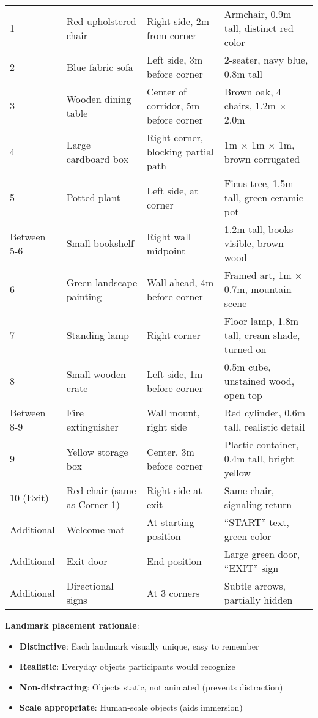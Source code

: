 \documentclass[12pt]{article}
\begin{document}
\begin{longtable}{p{}p{}p{}p{}}
1 & Red upholstered chair & Right side, 2m from corner & Armchair, 0.9m tall, distinct red color \\
2 & Blue fabric sofa & Left side, 3m before corner & 2-seater, navy blue, 0.8m tall \\
3 & Wooden dining table & Center of corridor, 5m before corner & Brown oak, 4 chairs, 1.2m $\times$ 2.0m \\
4 & Large cardboard box & Right corner, blocking partial path & 1m $\times$ 1m $\times$ 1m, brown corrugated \\
5 & Potted plant & Left side, at corner & Ficus tree, 1.5m tall, green ceramic pot \\
Between 5-6 & Small bookshelf & Right wall midpoint & 1.2m tall, books visible, brown wood \\
6 & Green landscape painting & Wall ahead, 4m before corner & Framed art, 1m $\times$ 0.7m, mountain scene \\
7 & Standing lamp & Right corner & Floor lamp, 1.8m tall, cream shade, turned on \\
8 & Small wooden crate & Left side, 1m before corner & 0.5m cube, unstained wood, open top \\
Between 8-9 & Fire extinguisher & Wall mount, right side & Red cylinder, 0.6m tall, realistic detail \\
9 & Yellow storage box & Center, 3m before corner & Plastic container, 0.4m tall, bright yellow \\
10 (Exit) & Red chair (same as Corner 1) & Right side at exit & Same chair, signaling return \\
Additional & Welcome mat & At starting position & ``START'' text, green color \\
Additional & Exit door & End position & Large green door, ``EXIT'' sign \\
Additional & Directional signs & At 3 corners & Subtle arrows, partially hidden \\
\end{longtable}

\textbf{Landmark placement rationale}:
\begin{itemize}
    \item \textbf{Distinctive}: Each landmark visually unique, easy to remember
    \item \textbf{Realistic}: Everyday objects participants would recognize
    \item \textbf{Non-distracting}: Objects static, not animated (prevents distraction)
    \item \textbf{Scale appropriate}: Human-scale objects (aids immersion)
\end{itemize}
\end{document}
